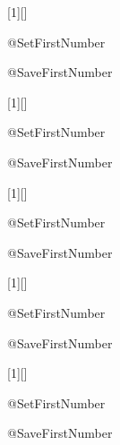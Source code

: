 \newcommand{\mdot}[1]{\accentset{\mbox{\bullet}}{#1}}
\newcommand{\mmdot}[1]{\accentset{\mbox{\bullet\bullet}}{#1}}

\renewcommand{\overrightarrow}{\vv}

\DeclareRobustCommand{\Cpp}
{\valign{\vfil\hbox{##}\vfil\cr
   \textsf{C\kern-.1em}\cr
   $\hbox{\fontsize{\ssf@size}{0}\textbf{+\kern-0.05em+}}$\cr}%
}

\usepackage{listings}

[1][]
    {\lstset{language=C++,
        #1}%
        \noindent\begin{minipage}{\textwidth}\csname\@lst @SetFirstNumber\endcsname\end{minipage}}
        {\csname\@lst @SaveFirstNumber\endcsname}

[1][]
    {\lstset{language=[77]Fortran,
        #1}%
        \noindent\begin{minipage}{\textwidth}\csname\@lst @SetFirstNumber\endcsname\end{minipage}}
        {\csname\@lst @SaveFirstNumber\endcsname}

[1][]
    {%
        \noindent\begin{minipage}{\textwidth}\csname\@lst @SetFirstNumber\endcsname\end{minipage}}
        {\csname\@lst @SaveFirstNumber\endcsname}

[1][]
    {%
        \noindent\begin{minipage}{\textwidth}\csname\@lst @SetFirstNumber\endcsname\end{minipage}}
        {\csname\@lst @SaveFirstNumber\endcsname}

[1][]
	{\lstset{language=bash,
		#1}%
	\noindent\begin{minipage}{\textwidth}\csname\@lst @SetFirstNumber\endcsname\end{minipage}}
{\csname\@lst @SaveFirstNumber\endcsname}

\newsavebox\mypostbreak
\savebox\mypostbreak{\raisebox{0ex}[0ex][0ex]{\ensuremath{\color{myRed}\hookrightarrow\space}}}

